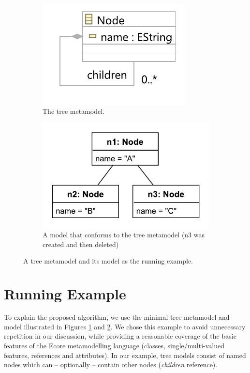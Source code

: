 \documentclass{llncs}
\begin{document}
\begin{figure}[b]
    \begin{subfigure}[t]{0.4\linewidth}
        \centering
        \includegraphics[width=0.8\linewidth]{node_metamodel}
        \caption{The tree metamodel.}
        \label{fig:tree_metamodel}
    \end{subfigure}
    \hfill
    \begin{subfigure}[t]{0.6\linewidth}
        \centering
        \includegraphics[width=\linewidth]{initial_chart}
        \caption{A model that conforms to the tree metamodel (n3 was created and then deleted)}
        \label{fig:initial_model}
    \end{subfigure}
    \caption{A tree metamodel and its model as the running example.}
    \label{fig:append_speed}
\end{figure}

\section{Running Example}
\label{sec:case_study}
To explain the proposed algorithm, we use the minimal tree metamodel and model illustrated in Figures \ref{fig:tree_metamodel} and \ref{fig:initial_model}. We chose this example to avoid unnecessary repetition in our discussion, while providing a reasonable coverage of the basic features of the Ecore metamodelling language (classes, single/multi-valued features, references and attributes). In our example, tree models consist of named nodes which can -- optionally -- contain other nodes (\emph{children} reference).
\end{document}
